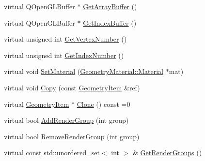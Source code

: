 \begin{DoxyCompactItemize}
\item 
virtual Q\+Open\+G\+L\+Buffer $\ast$ \mbox{\hyperlink{class_geometry_engine_1_1_geometry_world_item_1_1_geometry_item_1_1_geometry_item_a31eb19087cd7b37904df64fa5d01b754}{Get\+Array\+Buffer}} ()
\item 
virtual Q\+Open\+G\+L\+Buffer $\ast$ \mbox{\hyperlink{class_geometry_engine_1_1_geometry_world_item_1_1_geometry_item_1_1_geometry_item_af2d4cda419c8047f37643d88187da62f}{Get\+Index\+Buffer}} ()
\item 
virtual unsigned int \mbox{\hyperlink{class_geometry_engine_1_1_geometry_world_item_1_1_geometry_item_1_1_geometry_item_ae9d76b83de2b2dec2b19c77fdf49f853}{Get\+Vertex\+Number}} ()
\item 
virtual unsigned int \mbox{\hyperlink{class_geometry_engine_1_1_geometry_world_item_1_1_geometry_item_1_1_geometry_item_a3c9f379b23e9066340295056a6b4ca35}{Get\+Index\+Number}} ()
\item 
virtual void \mbox{\hyperlink{class_geometry_engine_1_1_geometry_world_item_1_1_geometry_item_1_1_geometry_item_addd7b6651de0583209ec45ff1a813dd1}{Set\+Material}} (\mbox{\hyperlink{class_geometry_engine_1_1_geometry_material_1_1_material}{Geometry\+Material\+::\+Material}} $\ast$mat)
\item 
virtual void \mbox{\hyperlink{class_geometry_engine_1_1_geometry_world_item_1_1_geometry_item_1_1_geometry_item_a13a2a225acb39c559601c2151b4322bf}{Copy}} (const \mbox{\hyperlink{class_geometry_engine_1_1_geometry_world_item_1_1_geometry_item_1_1_geometry_item}{Geometry\+Item}} \&ref)
\item 
virtual \mbox{\hyperlink{class_geometry_engine_1_1_geometry_world_item_1_1_geometry_item_1_1_geometry_item}{Geometry\+Item}} $\ast$ \mbox{\hyperlink{class_geometry_engine_1_1_geometry_world_item_1_1_geometry_item_1_1_geometry_item_a1db8f97339ba49f746b3e0b4c4b02748}{Clone}} () const =0
\item 
virtual bool \mbox{\hyperlink{class_geometry_engine_1_1_geometry_world_item_1_1_geometry_item_1_1_geometry_item_adff9d0c0188f96abdbbec182ac1901d8}{Add\+Render\+Group}} (int group)
\item 
virtual bool \mbox{\hyperlink{class_geometry_engine_1_1_geometry_world_item_1_1_geometry_item_1_1_geometry_item_a7c2f338d13cf238060c10da51ee6dd14}{Remove\+Render\+Group}} (int group)
\item 
virtual const std\+::unordered\+\_\+set$<$ int $>$ \& \mbox{\hyperlink{class_geometry_engine_1_1_geometry_world_item_1_1_geometry_item_1_1_geometry_item_a573713d59a768141304466cce5ecf26e}{Get\+Render\+Groups}} ()

\end{DoxyCompactItemize}
